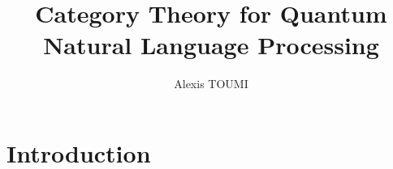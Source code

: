 

\title{Category Theory for Quantum\\
Natural Language Processing}
\author{Alexis TOUMI}

\degreedate{\today}




\begin{romanpages}
\maketitle



\tableofcontents

\end{romanpages}

\chapter*{Introduction}







